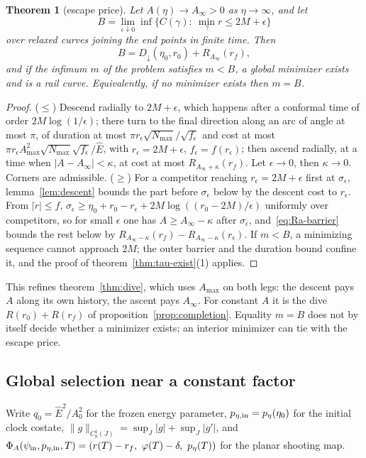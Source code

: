 \documentclass[aip,jmp,amsmath,amssymb,reprint]{revtex4-2}
\newcommand{\Ehat}{\hat E}
\theoremstyle{plain}
\newtheorem{theorem}{Theorem}
\theoremstyle{definition}
\begin{document}
\begin{theorem}[escape price]\label{thm:escape}
Let $A(\eta)\to A_\infty>0$ as $\eta\to\infty$, and let
\[
  B=\lim_{\epsilon\downarrow0}\inf\{C(\gamma):\ \min_\gamma r\le2M+\epsilon\}
\]
over relaxed curves joining the end points in finite time. Then
\[
  B=D_\downarrow(\eta_0,r_0)+R_{A_\infty}(r_f),
\]
and if the infimum $m$ of the problem satisfies $m<B$, a global minimizer exists and is a
rail curve. Equivalently, if no minimizer exists then $m=B$.
\end{theorem}

\begin{proof}
($\le$) Descend radially to $2M+\epsilon$, which happens after a conformal time of order
$2M\log(1/\epsilon)$; there turn to the final direction along an arc of angle at most $\pi$, of
duration at most $\pi r_\epsilon\sqrt{N_{\max}}/\sqrt{f_\epsilon}$ and cost at most
$\pi r_\epsilon A_{\max}^2\sqrt{N_{\max}}\sqrt{f_\epsilon}/\Ehat$, with $r_\epsilon=2M+\epsilon$, $f_\epsilon=f(r_\epsilon)$; then ascend radially, at a time when $|A-A_\infty|<\kappa$,
at cost at most $R_{A_\infty+\kappa}(r_f)$. Let $\epsilon\to0$, then $\kappa\to0$. Corners are
admissible. ($\ge$) For a competitor reaching $r_\epsilon=2M+\epsilon$ first at $\sigma_\epsilon$,
lemma~\ref{lem:descent} bounds the part before $\sigma_\epsilon$ below by the descent cost to
$r_\epsilon$. From $|\dot r|\le f$,
$\sigma_\epsilon\ge\eta_0+r_0-r_\epsilon+2M\log((r_0-2M)/\epsilon)$ uniformly over competitors, so for
small $\epsilon$ one has $A\ge A_\infty-\kappa$ after $\sigma_\epsilon$, and~\eqref{eq:Ra-barrier}
bounds the rest below by $R_{A_\infty-\kappa}(r_f)-R_{A_\infty-\kappa}(r_\epsilon)$. If $m<B$, a
minimizing sequence cannot approach $2M$; the outer barrier and the duration bound confine
it, and the proof of theorem~\ref{thm:tau-exist}(1) applies.
\end{proof}

This refines theorem~\ref{thm:dive}, which uses $A_{\max}$ on both legs: the descent pays $A$
along its own history, the ascent pays $A_\infty$. For constant $A$ it is the dive
$R(r_0)+R(r_f)$ of proposition~\ref{prop:completion}. Equality $m=B$ does not by itself
decide whether a minimizer exists; an interior minimizer can tie with the escape price.

\subsection{Global selection near a constant factor}
Write $q_0=\Ehat^2/A_0^2$ for the frozen energy parameter, $p_{\eta,{\rm in}}=p_\eta(\eta_0)$ for the initial
clock costate, $\|g\|_{C^1_b(J)}=\sup_J|g|+\sup_J|g'|$, and
$\Phi_A(\psi_{\rm in},p_{\eta,{\rm in}},T)=(r(T)-r_f,\ \varphi(T)-\delta,\ p_\eta(T))$ for the planar shooting map.
\end{document}
